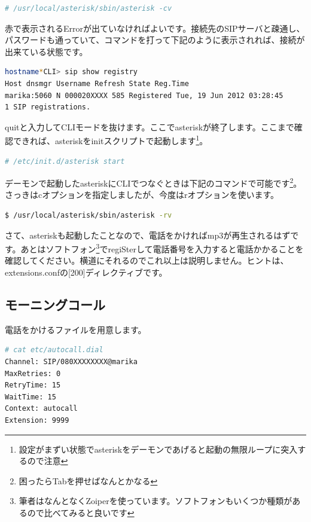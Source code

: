 \begin{lstlisting}[language=bash]
# /usr/local/asterisk/sbin/asterisk -cv
\end{lstlisting}

赤で表示されるErrorが出ていなければよいです。接続先のSIPサーバと疎通し、パスワードも通っていて、コマンドを打って下記のように表示されれば、接続が出来ている状態です。

\begin{lstlisting}[language=bash]
hostname*CLI> sip show registry 
Host dnsmgr Username Refresh State Reg.Time 
marika:5060 N 000020XXXX 585 Registered Tue, 19 Jun 2012 03:28:45
1 SIP registrations. 
\end{lstlisting}

quitと入力してCLIモードを抜けます。ここでasteriskが終了します。ここまで確認できれば、asteriskをinitスクリプトで起動します\footnote{設定がまずい状態でasteriskをデーモンであげると起動の無限ループに突入するので注意}。

\begin{lstlisting}[language=bash]
# /etc/init.d/asterisk start
\end{lstlisting}

デーモンで起動したasteriskにCLIでつなぐときは下記のコマンドで可能です\footnote{困ったらTabを押せばなんとかなる}。さっきはcオプションを指定しましたが、今度はrオプションを使います。

\begin{lstlisting}[language=bash]
$ /usr/local/asterisk/sbin/asterisk -rv
\end{lstlisting}

さて、asteriskも起動したことなので、電話をかければmp3が再生されるはずです。あとはソフトフォン\footnote{筆者はなんとなくZoiperを使っています。ソフトフォンもいくつか種類があるので比べてみると良いです}でregiSterして電話番号を入力すると電話かかることを確認してください。横道にそれるのでこれ以上は説明しません。ヒントは、extensions.confの[200]ディレクティブです。

\subsection{モーニングコール}
電話をかけるファイルを用意します。

\begin{lstlisting}[language=bash]
# cat etc/autocall.dial 
Channel: SIP/080XXXXXXXX@marika
MaxRetries: 0
RetryTime: 15
WaitTime: 15
Context: autocall
Extension: 9999
\end{lstlisting}

